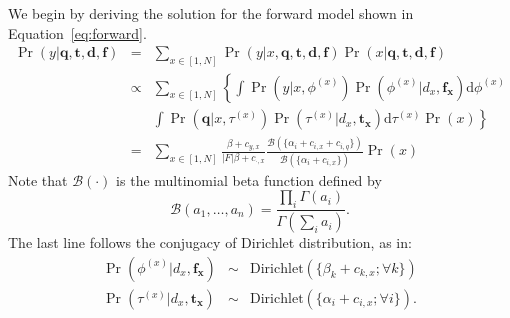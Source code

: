 We begin by deriving the solution for the forward model shown in
Equation~\eqref{eq:forward}. 
\begin{eqnarray}
  \Pr(y|\mathbf{q}, \mathbf{t}, \mathbf{d}, \mathbf{f}) 
  &=& \sum_{x \in [1, N]} \Pr(y|x, \mathbf{q}, \mathbf{t}, \mathbf{d}, \mathbf{f}) \Pr(x|\mathbf{q}, \mathbf{t}, \mathbf{d}, \mathbf{f}) \nonumber\\
  &\propto& \sum_{x \in [1, N]} \left\{ \int \Pr(y|x, \phi^{(x)}) \Pr(\phi^{(x)}|d_x, \mathbf{f_x}) \mathrm{d}\phi^{(x)} \right. \nonumber\\
  && \left. \int \Pr(\mathbf{q}| x, \tau^{(x)}) \Pr(\tau^{(x)}|d_x, \mathbf{t_x})\mathrm{d}\tau^{(x)} \Pr(x) \right\} \nonumber\\
  &=& \sum_{x \in [1, N]} \frac{\beta + c_{y,x}}{|F|\beta + c_{\cdot,x}} \frac{\mathcal{B}(\{\alpha_i + c_{i,x} + c_{i,q} \})}{\mathcal{B}(\{\alpha_i + c_{i,x} \})} \Pr(x) \label{eq:forward-solution}
\end{eqnarray}
Note that $\mathcal{B}(\cdot)$ is the multinomial beta
function defined by \[\mathcal{B}(a_1, \ldots, a_n) = \frac{\prod_i
\Gamma(a_i)}{\Gamma(\sum_i a_i)}. \]
The last line follows the conjugacy of Dirichlet distribution, as in:
\begin{eqnarray*}
\Pr(\phi^{(x)}|d_x,\mathbf{f_x}) &\sim& \mathrm{Dirichlet}(\{\beta_k + c_{k,x}; \forall k \}) \\
\Pr(\tau^{(x)}|d_x, \mathbf{t_x}) &\sim& \mathrm{Dirichlet}(\{\alpha_i + c_{i,x}; \forall i \}).
\end{eqnarray*}

